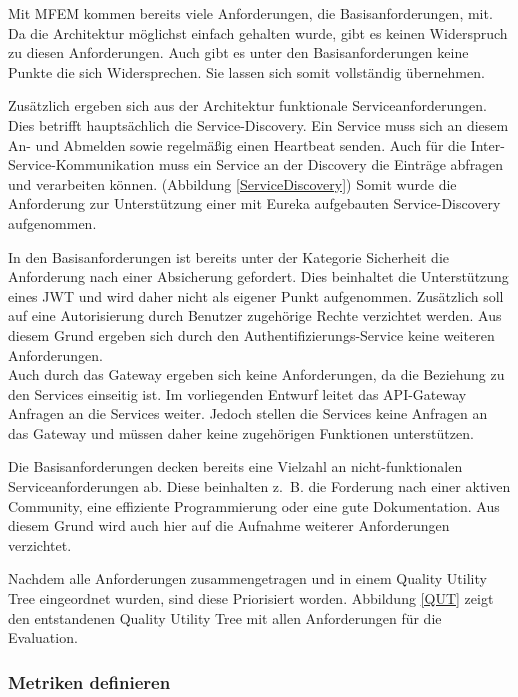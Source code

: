 Mit \ac{MFEM} kommen bereits viele Anforderungen, die Basisanforderungen, mit. Da die Architektur möglichst einfach gehalten wurde, gibt es keinen Widerspruch zu diesen Anforderungen. Auch gibt es unter den Basisanforderungen keine Punkte die sich Widersprechen. Sie lassen sich somit vollständig übernehmen.

Zusätzlich ergeben sich aus der Architektur funktionale Serviceanforderungen. Dies betrifft hauptsächlich die Service-Discovery. Ein Service muss sich an diesem An- und Abmelden sowie regelmäßig einen Heartbeat senden. Auch für die Inter-Service-Kommunikation muss ein Service an der Discovery die Einträge abfragen und verarbeiten können. (Abbildung \ref{ServiceDiscovery}) Somit wurde die Anforderung zur Unterstützung einer mit Eureka aufgebauten Service-Discovery aufgenommen.

In den Basisanforderungen ist bereits unter der Kategorie Sicherheit die Anforderung nach einer Absicherung gefordert. Dies beinhaltet die Unterstützung eines \ac{JWT} und wird daher nicht als eigener Punkt aufgenommen. Zusätzlich soll auf eine Autorisierung durch Benutzer zugehörige Rechte verzichtet werden. 
Aus diesem Grund ergeben sich durch den Authentifizierungs-Service keine weiteren Anforderungen.\\
Auch durch das Gateway ergeben sich keine Anforderungen, da die Beziehung zu den Services einseitig ist. Im vorliegenden Entwurf leitet das API-Gateway Anfragen an die Services weiter. Jedoch stellen die Services keine Anfragen an das Gateway und müssen daher keine zugehörigen Funktionen unterstützen.

Die Basisanforderungen decken bereits eine Vielzahl an nicht-funktionalen Serviceanforderungen ab. Diese beinhalten z.~B. die Forderung nach einer aktiven Community, eine effiziente Programmierung oder eine gute Dokumentation. Aus diesem Grund wird auch hier auf die Aufnahme weiterer Anforderungen verzichtet.

Nachdem alle Anforderungen zusammengetragen und in einem Quality Utility Tree eingeordnet wurden, sind diese Priorisiert worden. Abbildung \ref{QUT} zeigt den entstandenen Quality Utility Tree mit allen Anforderungen für die Evaluation.


\subsubsection{Metriken definieren}

